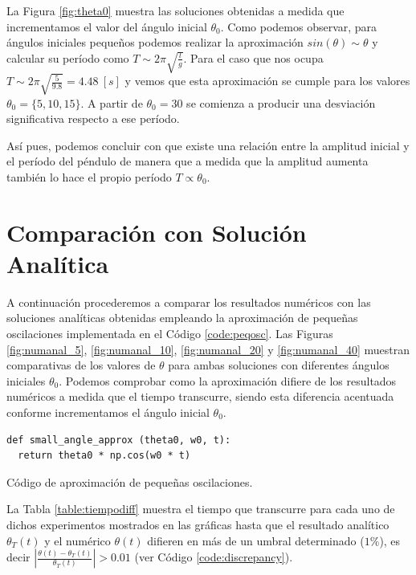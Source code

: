 \documentclass[journal]{IEEEtran}
\newenvironment{code}{\captionsetup{type=listing}}{\par\addvspace{\baselineskip}}
\begin{document}
La Figura \ref{fig:theta0} muestra las soluciones obtenidas a medida que incrementamos el valor del ángulo inicial $\theta_0$. Como podemos observar, para ángulos iniciales pequeños podemos realizar la aproximación $sin(\theta) \sim \theta$ y calcular su período como $T \sim 2\pi\sqrt{\frac{l}{g}}$. Para el caso que nos ocupa $T \sim 2\pi\sqrt{\frac{5}{9.8}} = 4.48~[s]$ y vemos que esta aproximación se cumple para los valores $\theta_0 = \{5, 10,
15\}$. A partir de $\theta_0 = 30$ se comienza a producir una desviación significativa respecto a ese período.

Así pues, podemos concluir con que existe una relación entre la amplitud inicial y el período del péndulo de manera que a medida que la amplitud aumenta también lo hace el propio período $T\propto \theta_0$.

\section{Comparación con Solución Analítica}

A continuación procederemos a comparar los resultados numéricos con las soluciones analíticas obtenidas empleando la aproximación de pequeñas oscilaciones implementada en el Código \ref{code:peqosc}. Las Figuras \ref{fig:numanal_5}, \ref{fig:numanal_10}, \ref{fig:numanal_20} y \ref{fig:numanal_40} muestran comparativas de los valores de $\theta$ para ambas soluciones con diferentes ángulos iniciales $\theta_0$. Podemos comprobar como la aproximación difiere de los resultados numéricos a medida que el tiempo transcurre, siendo esta diferencia acentuada conforme incrementamos el ángulo inicial $\theta_0$.

\medskip

\begin{code}
  \begin{verbatim}
def small_angle_approx (theta0, w0, t):
  return theta0 * np.cos(w0 * t)
  \end{verbatim}
  \caption{Código de aproximación de pequeñas oscilaciones.}
  \label{code:peqosc}
\end{code}
La Tabla \ref{table:tiempodiff} muestra el tiempo que transcurre para cada uno de dichos experimentos mostrados en las gráficas hasta que el resultado analítico $\theta_T(t)$ y el numérico $\theta(t)$ difieren en más de un umbral determinado ($1\%$), es decir $\left|\displaystyle\frac{\theta(t) - \theta_T(t)}{\theta_T(t)}\right|>0.01$ (ver Código \ref{code:discrepancy}).

\medskip
\end{document}
